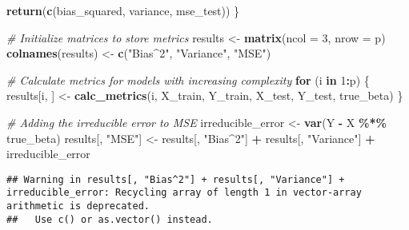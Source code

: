 \documentclass[
]{article}
\newenvironment{Shaded}{\begin{snugshade}}{\end{snugshade}}
\newcommand{\AttributeTok}[1]{\textcolor[rgb]{0.13,0.29,0.53}{#1}}
\newcommand{\CommentTok}[1]{\textcolor[rgb]{0.56,0.35,0.01}{\textit{#1}}}
\newcommand{\ControlFlowTok}[1]{\textcolor[rgb]{0.13,0.29,0.53}{\textbf{#1}}}
\newcommand{\DecValTok}[1]{\textcolor[rgb]{0.00,0.00,0.81}{#1}}
\newcommand{\FunctionTok}[1]{\textcolor[rgb]{0.13,0.29,0.53}{\textbf{#1}}}
\newcommand{\NormalTok}[1]{#1}
\newcommand{\OtherTok}[1]{\textcolor[rgb]{0.56,0.35,0.01}{#1}}
\newcommand{\SpecialCharTok}[1]{\textcolor[rgb]{0.81,0.36,0.00}{\textbf{#1}}}
\newcommand{\StringTok}[1]{\textcolor[rgb]{0.31,0.60,0.02}{#1}}
\begin{document}
\begin{Shaded}
\begin{Highlighting}[]
  \FunctionTok{return}\NormalTok{(}\FunctionTok{c}\NormalTok{(bias\_squared, variance, mse\_test))}
\NormalTok{\}}

\CommentTok{\# Initialize matrices to store metrics}
\NormalTok{results }\OtherTok{\textless{}{-}} \FunctionTok{matrix}\NormalTok{(}\AttributeTok{ncol =} \DecValTok{3}\NormalTok{, }\AttributeTok{nrow =}\NormalTok{ p)}
\FunctionTok{colnames}\NormalTok{(results) }\OtherTok{\textless{}{-}} \FunctionTok{c}\NormalTok{(}\StringTok{"Bias\^{}2"}\NormalTok{, }\StringTok{"Variance"}\NormalTok{, }\StringTok{"MSE"}\NormalTok{)}

\CommentTok{\# Calculate metrics for models with increasing complexity}
\ControlFlowTok{for}\NormalTok{ (i }\ControlFlowTok{in} \DecValTok{1}\SpecialCharTok{:}\NormalTok{p) \{}
\NormalTok{  results[i, ] }\OtherTok{\textless{}{-}} \FunctionTok{calc\_metrics}\NormalTok{(i, X\_train, Y\_train, X\_test, Y\_test, true\_beta)}
\NormalTok{\}}

\CommentTok{\# Adding the irreducible error to MSE}
\NormalTok{irreducible\_error }\OtherTok{\textless{}{-}} \FunctionTok{var}\NormalTok{(Y }\SpecialCharTok{{-}}\NormalTok{ X }\SpecialCharTok{\%*\%}\NormalTok{ true\_beta)}
\NormalTok{results[, }\StringTok{"MSE"}\NormalTok{] }\OtherTok{\textless{}{-}}\NormalTok{ results[, }\StringTok{"Bias\^{}2"}\NormalTok{] }\SpecialCharTok{+}\NormalTok{ results[, }\StringTok{"Variance"}\NormalTok{] }\SpecialCharTok{+}\NormalTok{ irreducible\_error}
\end{Highlighting}
\end{Shaded}

\begin{verbatim}
## Warning in results[, "Bias^2"] + results[, "Variance"] + irreducible_error: Recycling array of length 1 in vector-array arithmetic is deprecated.
##   Use c() or as.vector() instead.
\end{verbatim}
\end{document}
